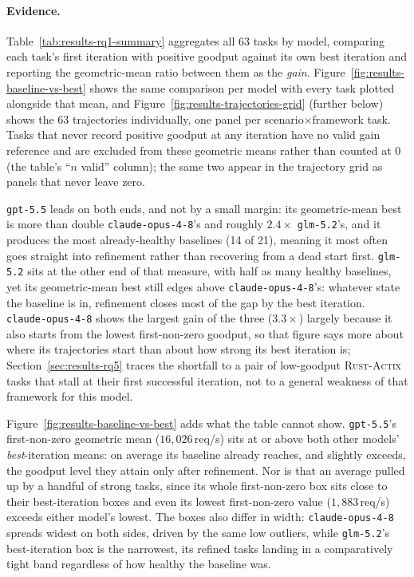 \paragraph{Evidence.}
Table~\ref{tab:results-rq1-summary} aggregates all 63 tasks by model,
comparing each task's first iteration with positive goodput against its
own best iteration and reporting the geometric-mean ratio between them as
the \emph{gain}. Figure~\ref{fig:results-baseline-vs-best} shows the same
comparison per model with every task plotted alongside that mean, and
Figure~\ref{fig:results-trajectories-grid} (further below) shows the 63
trajectories individually, one panel per scenario$\times$framework task.
Tasks that never record positive goodput at any iteration have no valid
gain reference and are excluded from these geometric means rather than
counted at $0$ (the table's ``$n$ valid'' column); the same two appear in
the trajectory grid as panels that never leave zero.

\texttt{gpt-5.5} leads on both ends, and not by a small margin: its
geometric-mean best is more than double \texttt{claude-opus-4-8}'s and
roughly $2.4\times$ \texttt{glm-5.2}'s, and it produces the most
already-healthy baselines (14 of 21), meaning it most often goes straight
into refinement rather than recovering from a dead start first.
\texttt{glm-5.2} sits at the other end of that measure, with half as many
healthy baselines, yet its geometric-mean best still edges above
\texttt{claude-opus-4-8}'s: whatever state the baseline is in, refinement
closes most of the gap by the best iteration. \texttt{claude-opus-4-8}
shows the largest gain of the three ($3.3\times$) largely because it also
starts from the lowest first-non-zero goodput, so that figure says more
about where its trajectories start than about how strong its best
iteration is; Section~\ref{sec:results-rq5} traces the shortfall to a
pair of low-goodput \textsc{Rust-Actix} tasks that stall at their first
successful iteration, not to a general weakness of that framework for
this model.

Figure~\ref{fig:results-baseline-vs-best} adds what the table cannot
show. \texttt{gpt-5.5}'s first-non-zero geometric mean
($16{,}026$\,req/s) sits at or above both other models'
\emph{best}-iteration means: on average its baseline already reaches, and
slightly exceeds, the goodput level they attain only after refinement.
Nor is that an average pulled up by a handful of strong tasks, since its
whole first-non-zero box sits close to their best-iteration boxes and
even its lowest first-non-zero value ($1{,}883$\,req/s) exceeds either
model's lowest. The boxes also differ in width:
\texttt{claude-opus-4-8} spreads widest on both sides, driven by the same
low outliers, while \texttt{glm-5.2}'s best-iteration box is the
narrowest, its refined tasks landing in a comparatively tight band
regardless of how healthy the baseline was.

